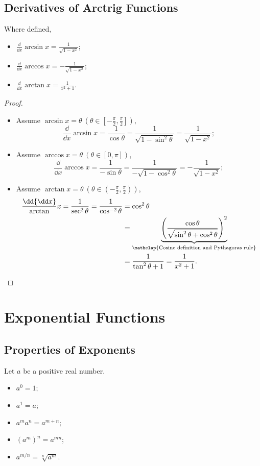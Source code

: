 \subsection{Derivatives of Arctrig Functions}
Where defined,
\begin{itemize}
  \item$\frac\dd{\dd x}\arcsin x=\frac1{\sqrt{1-x^2}}$;
  \item$\frac\dd{\dd x}\arccos x=-\frac1{\sqrt{1-x^2}}$;
  \item$\frac\dd{\dd x}\arctan x=\frac1{x^2+1}$.
\end{itemize}
\begin{proof}\leavevmode
  \begin{itemize}
  \item Assume $\arcsin x=\theta\ \left(\theta\in\left[-\frac\pi 2,\frac\pi 2\right]\right)$,
    \[
    \frac\dd{\dd x}\arcsin x=\frac1{\cos\theta}=\frac1{\sqrt{1-\sin^2 \theta}}=\frac1{\sqrt{1-x^2}};
    \]
  \item Assume $\arccos x=\theta\ \left(\theta\in\left[0,\pi\right]\right)$,
    \[
    \frac\dd{\dd x}\arccos x=\frac1{-\sin\theta}=\frac1{-\sqrt{1-\cos^2 \theta}}=-\frac1{\sqrt{1-x^2}};
    \]
  \item Assume $\arctan x=\theta\ \left(\theta\in\left(-\frac\pi 2,\frac\pi 2\right)\right)$,
    \begin{align*}
      \frac\dd{\dd x}\arctan x=\frac1{\sec^2 \theta}=\frac1{\cos^{-2}\theta}
      & =\cos^2 \theta\\
      & =\underbrace{\left(\frac{\cos\theta}{\sqrt{\sin^2 \theta+\cos^2 \theta}}\right)^2}_{\mathclap{\text{Cosine definition and Pythagoras rule}}}\\
      & =\frac1{\tan^2 \theta+1}=\frac1{x^2+1}.
    \end{align*}
  \end{itemize}
\end{proof}

\section{Exponential Functions}
\subsection{Properties of Exponents}
Let $a$ be a positive real number.
\begin{itemize}
\item $a^0=1$;
\item $a^1=a$;
\item $a^m a^n=a^{m+n}$;
\item $(a^m)^n=a^{mn}$;
\item $a^{m/n}=\sqrt[n]{a^m}$.
\end{itemize}


